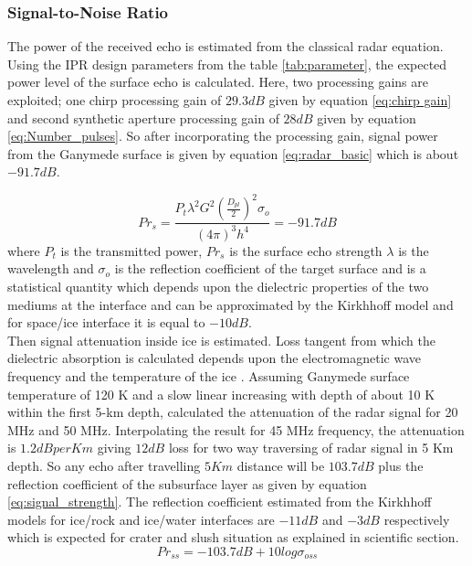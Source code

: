 \subsubsection{Signal-to-Noise Ratio}

The power of the received echo is estimated from the classical radar equation. Using the \ac{IPR} design parameters from the table \ref{tab:parameter}, the expected power level of the surface echo is calculated. Here, two processing gains are exploited; one chirp processing gain of $29.3 dB$ given by equation \ref{eq:chirp gain} and second synthetic aperture processing gain of $28 dB$ given by equation \ref{eq:Number_pulses}. So after incorporating the processing gain, signal power from the Ganymede surface is given by equation \ref{eq:radar_basic} which is about $-91.7 dB$.

\begin{equation}
Pr_{s} = \dfrac{P_{t}\lambda^{2}G^{2}(\frac{D_{pl}}{2})^{2}\sigma_{o}}{(4\pi)^{3}h^{4}} 
	  = -91.7 dB 
\label{eq:radar_basic}
\end{equation}
where $P_{t}$ is the transmitted power, $Pr_{s}$ is the surface echo strength $\lambda$ is the wavelength  and $\sigma_{o}$ is the reflection coefficient of the target surface and is a statistical quantity which depends upon the dielectric properties of the two mediums at the interface and can be approximated by the Kirkhhoff model \cite{MIMOSA} and for space/ice interface it is equal to $-10 dB$.\\
%
Then signal attenuation inside ice is estimated. Loss tangent from which the dielectric absorption is calculated depends upon the electromagnetic wave frequency and the temperature of the ice \cite{MIMOSA}. Assuming Ganymede surface temperature of 120 K and a slow linear increasing with depth of about 10 K within the first 5-km depth, \cite{Gany_SRS} calculated the attenuation of the radar signal for 20 MHz and 50 MHz. Interpolating the result for 45 MHz frequency, the attenuation is $1.2 dB per Km$ giving $12 dB$ loss for two way traversing of radar signal in 5 Km depth. So any echo after travelling $5 Km $ distance will be $103.7 dB$ plus the reflection coefficient of the subsurface layer as given by equation \ref{eq:signal_strength}. The reflection coefficient estimated from the Kirkhhoff models for ice/rock and ice/water interfaces are $-11 dB$ and $-3 dB$ respectively which is expected for  crater and slush situation as explained in scientific section.
%
\begin{equation}
Pr_{ss} = -103.7 dB + 10 log \sigma_{oss}
\label{eq:signal_strength}
\end{equation}
